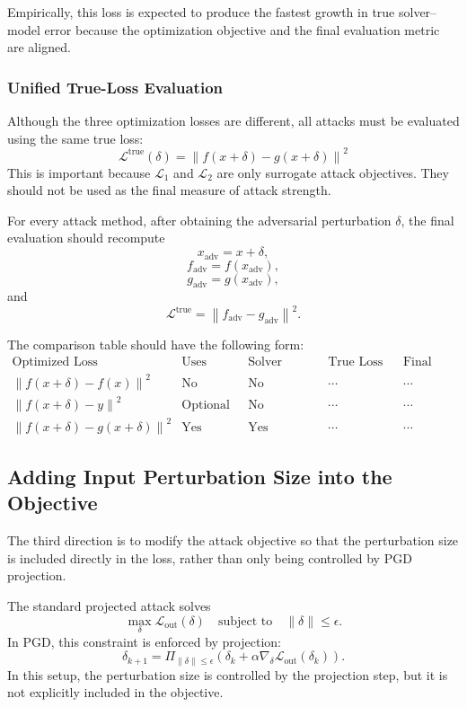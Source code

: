\documentclass{article}
\begin{document}
Empirically, this loss is expected to produce the fastest growth in true solver--model error because the optimization objective and the final evaluation metric are aligned.

\subsubsection{Unified True-Loss Evaluation}

Although the three optimization losses are different, all attacks must be evaluated using the same true loss:
\[
\boxed{
\mathcal{L}^{\mathrm{true}}(\delta)
=
\left\|
f(x+\delta)-g(x+\delta)
\right\|^2
}
\]
This is important because \(\mathcal{L}_1\) and \(\mathcal{L}_2\) are only surrogate attack objectives. They should not be used as the final measure of attack strength.

For every attack method, after obtaining the adversarial perturbation \(\delta\), the final evaluation should recompute
\[
x_{\mathrm{adv}} = x+\delta,
\]
\[
f_{\mathrm{adv}} = f(x_{\mathrm{adv}}),
\]
\[
g_{\mathrm{adv}} = g(x_{\mathrm{adv}}),
\]
and
\[
\mathcal{L}^{\mathrm{true}}
=
\left\|
f_{\mathrm{adv}}-g_{\mathrm{adv}}
\right\|^2.
\]

The comparison table should have the following form:
\[
\begin{array}{c|c|c|c|c}
\text{Optimized Loss}
&
\text{Uses Solver?}
&
\text{Solver Gradient?}
&
\text{True Loss Growth}
&
\text{Final True Loss}
\\
\hline
\left\|f(x+\delta)-f(x)\right\|^2
&
\text{No}
&
\text{No}
&
\cdots
&
\cdots
\\
\left\|f(x+\delta)-y\right\|^2
&
\text{Optional}
&
\text{No}
&
\cdots
&
\cdots
\\
\left\|f(x+\delta)-g(x+\delta)\right\|^2
&
\text{Yes}
&
\text{Yes}
&
\cdots
&
\cdots
\end{array}
\]

\subsection{Adding Input Perturbation Size into the Objective}

The third direction is to modify the attack objective so that the perturbation size is included directly in the loss, rather than only being controlled by PGD projection.

The standard projected attack solves
\[
\max_{\delta}
\mathcal{L}_{\mathrm{out}}(\delta)
\quad
\text{subject to}
\quad
\|\delta\| \leq \epsilon.
\]
In PGD, this constraint is enforced by projection:
\[
\delta_{k+1}
=
\Pi_{\|\delta\|\leq \epsilon}
\left(
\delta_k + \alpha \nabla_\delta \mathcal{L}_{\mathrm{out}}(\delta_k)
\right).
\]
In this setup, the perturbation size is controlled by the projection step, but it is not explicitly included in the objective.
\end{document}
